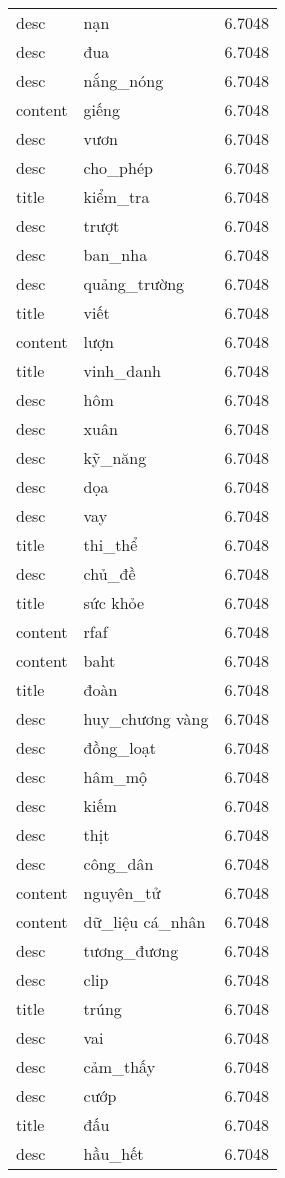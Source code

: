 \documentclass{article}
\begin{document}
\begin{tabular}{lll}
desc & nạn & 6.7048\\
desc & đua & 6.7048\\
desc & nắng\_nóng & 6.7048\\
content & giếng & 6.7048\\
desc & vươn & 6.7048\\
desc & cho\_phép & 6.7048\\
title & kiểm\_tra & 6.7048\\
desc & trượt & 6.7048\\
desc & ban\_nha & 6.7048\\
desc & quảng\_trường & 6.7048\\
title & viết & 6.7048\\
content & lượn & 6.7048\\
title & vinh\_danh & 6.7048\\
desc & hôm & 6.7048\\
desc & xuân & 6.7048\\
desc & kỹ\_năng & 6.7048\\
desc & dọa & 6.7048\\
desc & vay & 6.7048\\
title & thi\_thể & 6.7048\\
desc & chủ\_đề & 6.7048\\
title & sức khỏe & 6.7048\\
content & rfaf & 6.7048\\
content & baht & 6.7048\\
title & đoàn & 6.7048\\
desc & huy\_chương vàng & 6.7048\\
desc & đồng\_loạt & 6.7048\\
desc & hâm\_mộ & 6.7048\\
desc & kiếm & 6.7048\\
desc & thịt & 6.7048\\
desc & công\_dân & 6.7048\\
content & nguyên\_tử & 6.7048\\
content & dữ\_liệu cá\_nhân & 6.7048\\
desc & tương\_đương & 6.7048\\
desc & clip & 6.7048\\
title & trúng & 6.7048\\
desc & vai & 6.7048\\
desc & cảm\_thấy & 6.7048\\
desc & cướp & 6.7048\\
title & đấu & 6.7048\\
desc & hầu\_hết & 6.7048\\

\end{tabular}
\end{document}

